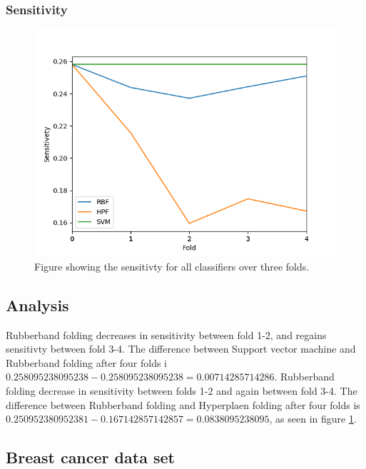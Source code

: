 \documentclass[a4paper,twoside]{bth}
\begin{document}
\subsubsection{Sensitivity}
\begin{figure}[!htb]
\centering
\includegraphics[scale=0.7]{images/result-liver/Sensitivety.png}
   \caption{Figure showing the sensitivty for all classifiers over three folds.}
   \label{fig:liver-Sensitivity}
\end{figure}

\FloatBarrier

\subsection{Analysis}
Rubberband folding decreases in sensitivity between fold 1-2, and regains sensitivty between fold 3-4. The difference between Support vector machine and Rubberband folding after four folds i $0.258095238095238 - 0.258095238095238 = 0.00714285714286$. Rubberband folding decrease in sensitivity between folds 1-2 and again between fold 3-4. The difference between Rubberband folding and Hyperplaen folding after four folds is $0.250952380952381 - 0.167142857142857 = 0.0838095238095$, as seen in figure \ref{fig:liver-Sensitivity}.

\clearpage
\FloatBarrier
\subsection{Breast cancer data set}
\end{document}
